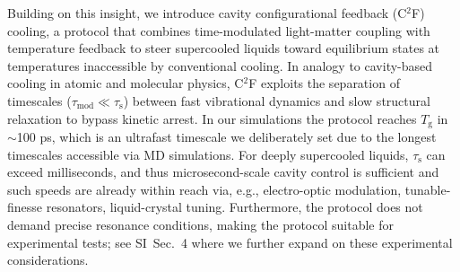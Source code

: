 \documentclass[aps, prl,
 reprint,
 superscriptaddress,
 citeautoscript,  %
 amsmath,amssymb,
 tightenlines
]{revtex4-2}
\begin{document}
Building on this insight, we introduce cavity configurational feedback (C$^2$F) cooling, a protocol that combines time-modulated light-matter coupling with temperature feedback to steer supercooled liquids toward equilibrium states at temperatures inaccessible by conventional cooling. In analogy to cavity-based cooling in atomic and molecular physics, C$^2$F exploits the separation of timescales ($\tau_\mathrm{mod} \ll \tau_\mathrm{s}$) between fast vibrational dynamics and slow structural relaxation to bypass kinetic arrest. In our simulations the protocol reaches $T_\mathrm{g}$ in $\sim$100 ps, which is an ultrafast timescale we deliberately set due to the longest timescales accessible via MD simulations. For deeply supercooled liquids, $\tau_\mathrm{s}$ can exceed milliseconds, and thus microsecond-scale cavity control is sufficient and such speeds are already within reach via, e.g., electro-optic modulation,\cite{dutta2017alloptical} tunable-finesse resonators,\cite{stone2020optical} liquid-crystal tuning.\cite{yavorskiy2025terahertz} Furthermore, the protocol does not demand precise resonance conditions, making the protocol suitable for experimental tests; see SI~Sec.~4 where we  further expand on these experimental considerations.



\end{document}

